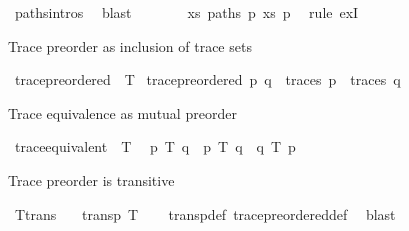 \begin{isabellebody}
\ paths{\isachardot}{\kern0pt}intros{\isacharparenleft}{\kern0pt}{}{\isacharparenright}{\kern0pt}\ \isamarkupfalse%
\ blast\isanewline
\ \ \ \ \isamarkupfalse%
\ \isamarkupfalse%
\ {\isachardoublequoteopen}{\isasymexists}xs{\isachardot}{\kern0pt}\ paths\ p\ xs\ p{\isacharprime}{\kern0pt}{\isacharprime}{\kern0pt}{\isachardoublequoteclose}\ \isamarkupfalse%
\ {\isacharparenleft}{\kern0pt}rule\ exI{\isacharparenright}{\kern0pt}\isanewline
\ \ \isamarkupfalse%
\isanewline
{}\isamarkupfalse%
%
\endisatagproof
{\isafoldproof}%
%
\isadelimproof
%
\endisadelimproof
%
\begin{isamarkuptext}%
Trace preorder as inclusion of trace sets%
\end{isamarkuptext}\isamarkuptrue%
\isamarkupfalse%
\ trace{\isacharunderscore}{\kern0pt}preordered\ {\isacharparenleft}{\kern0pt}\ {\isacartoucheopen}{\isasymlesssim}T{\isacartoucheclose}\ {}{}{\isacharparenright}{\kern0pt}\isanewline
{\isacartoucheopen}trace{\isacharunderscore}{\kern0pt}preordered\ p\ q\ {\isasymequiv}\ traces\ p\ {\isasymsubseteq}\ traces\ q{\isacartoucheclose}%
\begin{isamarkuptext}%
Trace equivalence as mutual preorder%
\end{isamarkuptext}\isamarkuptrue%
\isamarkupfalse%
\ trace{\isacharunderscore}{\kern0pt}equivalent\ {\isacharparenleft}{\kern0pt}\ {\isacartoucheopen}{\isasymsimeq}T{\isacartoucheclose}\ {}{}{\isacharparenright}{\kern0pt}\ \isanewline
{\isacartoucheopen}p\ {\isasymsimeq}T\ q\ {\isasymequiv}\ p\ {\isasymlesssim}T\ q\ {\isasymand}\ q\ {\isasymlesssim}T\ p{\isacartoucheclose}%
\begin{isamarkuptext}%
Trace preorder is transitive%
\end{isamarkuptext}\isamarkuptrue%
\isamarkupfalse%
\ T{\isacharunderscore}{\kern0pt}trans{\isacharcolon}{\kern0pt}\isanewline
\ \ \ {\isacartoucheopen}transp\ {\isacharparenleft}{\kern0pt}{\isasymlesssim}T{\isacharparenright}{\kern0pt}{\isacartoucheclose}\isanewline
%
\isadelimproof
\ \ %
\endisadelimproof
%
\isatagproof
{}\isamarkupfalse%
\ transp{\isacharunderscore}{\kern0pt}def\ trace{\isacharunderscore}{\kern0pt}preordered{\isacharunderscore}{\kern0pt}def\ \isamarkupfalse%
\ blast%
\endisatagproof

\end{isabellebody}
